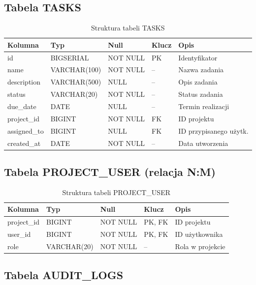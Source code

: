 \documentclass[12pt,a4paper]{report}
\begin{document}
\subsection{Tabela TASKS}

\begin{table}[H]
\centering
\caption{Struktura tabeli TASKS}
\begin{tabular}{|l|l|l|l|l|}
\hline
\textbf{Kolumna} & \textbf{Typ} & \textbf{Null} & \textbf{Klucz} & \textbf{Opis} \\
\hline
id & BIGSERIAL & NOT NULL & PK & Identyfikator \\
name & VARCHAR(100) & NOT NULL & -- & Nazwa zadania \\
description & VARCHAR(500) & NULL & -- & Opis zadania \\
status & VARCHAR(20) & NOT NULL & -- & Status zadania \\
due\_date & DATE & NULL & -- & Termin realizacji \\
project\_id & BIGINT & NOT NULL & FK & ID projektu \\
assigned\_to & BIGINT & NULL & FK & ID przypisanego użytk. \\
created\_at & DATE & NOT NULL & -- & Data utworzenia \\
\hline
\end{tabular}
\end{table}

\subsection{Tabela PROJECT\_USER (relacja N:M)}

\begin{table}[H]
\centering
\caption{Struktura tabeli PROJECT\_USER}
\begin{tabular}{|l|l|l|l|l|}
\hline
\textbf{Kolumna} & \textbf{Typ} & \textbf{Null} & \textbf{Klucz} & \textbf{Opis} \\
\hline
project\_id & BIGINT & NOT NULL & PK, FK & ID projektu \\
user\_id & BIGINT & NOT NULL & PK, FK & ID użytkownika \\
role & VARCHAR(20) & NOT NULL & -- & Rola w projekcie \\
\hline
\end{tabular}
\end{table}

\subsection{Tabela AUDIT\_LOGS}
\end{document}
